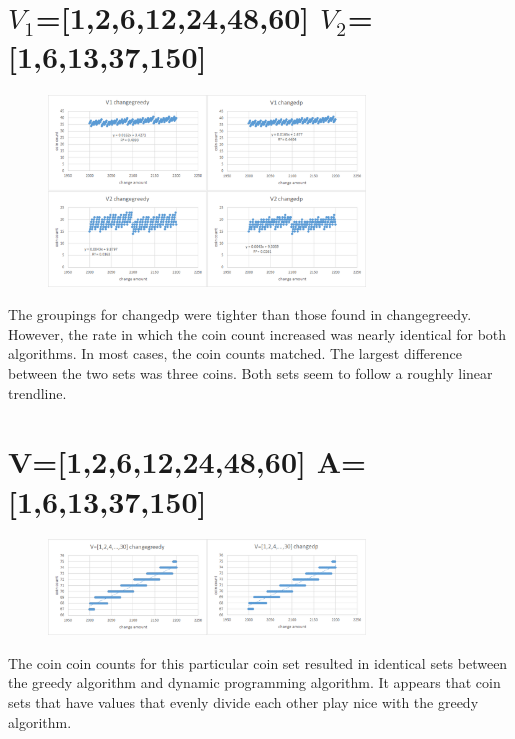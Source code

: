\documentclass[letWterpaper,10pt,titlepage]{article}
\begin{document}
\section{$V_1$=[1,2,6,12,24,48,60] $V_2$=[1,6,13,37,150]}
\begin{figure}[!ht]
    \centering
    \includegraphics[width=0.75\textwidth]{./p5.eps}
\end{figure}
The groupings for changedp were tighter than those found in changegreedy. However, the rate in which the coin count increased was nearly identical for both algorithms. In most cases, the coin counts matched. The largest difference between the two sets was three coins. Both sets seem to follow a roughly linear trendline.

\section{V=[1,2,6,12,24,48,60] A=[1,6,13,37,150]}
\begin{figure}[!ht]
    \centering
    \includegraphics[width=0.75\textwidth]{./p6.eps}
\end{figure}
The coin coin counts for this particular coin set resulted in identical sets between the greedy algorithm and dynamic programming algorithm. It appears that coin sets that have values that evenly divide each other play nice with the greedy algorithm.
\end{document}
